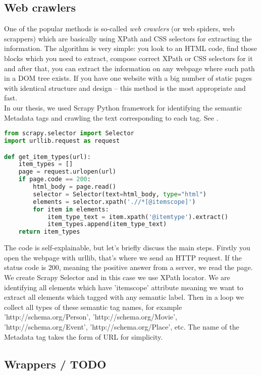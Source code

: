 \subsection{Web crawlers}

One of the popular methods is so-called \textit{web crawlers} (or web spiders, web scrappers) which are basically using XPath and CSS selectors for extracting the information. The algorithm is very simple: you look to an HTML code, find those blocks which you need to extract, compose correct XPath or CSS selectors for it and after that, you can extract the information on any webpage where such path in a DOM tree exists. If you have one website with a big number of static pages with identical structure and design -- this method is the most appropriate and fast. \\

In our thesis, we used Scrapy Python framework for identifying the semantic Metadata tags and crawling the text corresponding to each tag. See .

\begin{lstlisting}[language=Python, caption={Example of meta tag text scrapping with Scrapy Python framework}, label={img:scrapy}, captionpos=b]
from scrapy.selector import Selector
import urllib.request as request

def get_item_types(url):
    item_types = []
    page = request.urlopen(url)
    if page.code == 200:
        html_body = page.read()
        selector = Selector(text=html_body, type="html")
        elements = selector.xpath('.//*[@itemscope]')
        for item in elements:
            item_type_text = item.xpath('@itemtype').extract()
            item_types.append(item_type_text)
    return item_types 
\end{lstlisting}
The code is self-explainable, but let's briefly discuss the main steps. Firstly you open the webpage with urllib, that's where we send an HTTP request. If the status code is 200, meaning the positive answer from a server, we read the page. We create Scrapy Selector and in this case we use XPath locator. We are identifying all elements which have 'itemscope' attribute meaning we want to extract all elements which tagged with any semantic label. Then in a loop we collect all types of these semantic tag names, for example 'http://schema.org/Person', 'http://schema.org/Movie', 'http://schema.org/Event', 'http://schema.org/Place', etc. The name of the Metadata tag takes the form of URL for simplicity. 

\subsection{Wrappers / TODO}

